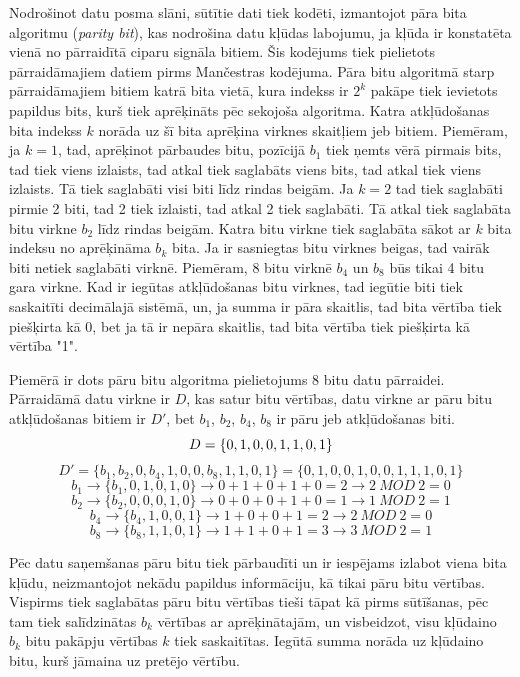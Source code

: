 \documentclass[12pt, a4paper, oneside, openright]{article}
\begin{document}
\par 
Nodrošinot datu posma slāni, sūtītie dati tiek kodēti, izmantojot pāra bita algoritmu (\textit{parity bit}), kas nodrošina datu kļūdas labojumu,
ja kļūda ir konstatēta vienā no pārraidītā ciparu signāla bitiem. Šis kodējums tiek pielietots
pārraidāmajiem datiem pirms Mančestras kodējuma.
Pāra bitu algoritmā starp pārraidāmajiem bitiem katrā bita vietā, kura indekss ir $2^k$ pakāpe tiek
ievietots papildus bits, kurš tiek aprēķināts pēc sekojoša algoritma. Katra atkļūdošanas bita indekss $k$
norāda uz šī bita aprēķina virknes skaitļiem jeb bitiem. Piemēram, ja $k = 1$, tad, aprēķinot pārbaudes bitu, 
pozīcijā $b_1$ tiek ņemts vērā pirmais bits, tad tiek viens izlaists, tad atkal tiek saglabāts viens bits, tad
atkal tiek viens izlaists. Tā tiek saglabāti visi biti līdz rindas beigām. Ja $k = 2$ tad tiek saglabāti pirmie 2 biti,
tad 2 tiek izlaisti, tad atkal 2 tiek saglabāti. Tā atkal tiek saglabāta bitu virkne $b_2$ līdz rindas beigām.
Katra bitu virkne tiek saglabāta sākot ar $k$ bita indeksu no aprēķināma $b_k$ bita. Ja ir sasniegtas bitu virknes beigas,
tad vairāk biti netiek saglabāti virknē. Piemēram, 8 bitu virknē $b_4$ un $b_8$ būs tikai 4 bitu gara virkne. 
Kad ir iegūtas atkļūdošanas bitu virknes, tad iegūtie biti tiek saskaitīti decimālajā sistēmā, un, ja
summa ir pāra skaitlis, tad bita vērtība tiek piešķirta kā 0, bet ja tā ir nepāra skaitlis, tad bita vērtība
tiek piešķirta kā vērtība "1".
\newpage
\par 
Piemērā ir dots pāru bitu algoritma pielietojums 8 bitu datu pārraidei. Pārraidāmā
datu virkne ir $D$, kas satur bitu vērtības, datu virkne ar pāru bitu atkļūdošanas bitiem ir $D'$,
bet $b_1$, $b_2$, $b_4$, $b_8$ ir pāru jeb atkļūdošanas biti.
$$
D = \{0,1,0,0,1,1,0,1\} \\
$$
$$
D' = \{b_1,b_2,0,b_4,1,0,0,b_8,1,1,0,1\} = \{0,1,0,0,1,0,0,1,1,1,0,1\} 
$$
$$
b_1 \rightarrow \{b_1,0,1,0,1,0\} \rightarrow 0 + 1 + 0 + 1 + 0 = 2 \rightarrow 2\ MOD\ 2 = 0
$$
$$
b_2 \rightarrow \{b_2,0,0,0,1,0\} \rightarrow 0 + 0 + 0 + 1 + 0 = 1 \rightarrow 1\ MOD\ 2 = 1
$$
$$
b_4 \rightarrow \{b_4,1,0,0,1\} \rightarrow 1 + 0 + 0 + 1 = 2 \rightarrow 2\ MOD\ 2 = 0
$$
$$
b_8 \rightarrow \{b_8,1,1,0,1\} \rightarrow 1 + 1 + 0 + 1 = 3 \rightarrow 3\ MOD\ 2 = 1
$$

\par
Pēc datu saņemšanas pāru bitu tiek pārbaudīti un ir iespējams izlabot viena bita kļūdu, neizmantojot nekādu
papildus informāciju, kā tikai pāru bitu vērtības. Vispirms tiek saglabātas pāru bitu vērtības
tieši tāpat kā pirms sūtīšanas, pēc tam tiek salīdzinātas $b_k$ vērtības ar aprēķinātajām, un 
visbeidzot, visu kļūdaino $b_k$ bitu pakāpju vērtības $k$ tiek saskaitītas. Iegūtā summa norāda uz kļūdaino
bitu, kurš jāmaina uz pretējo vērtību.
\end{document}
